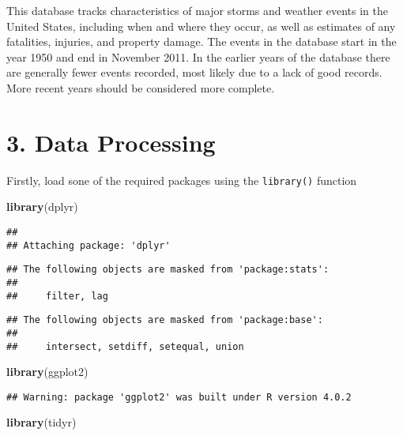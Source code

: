 \documentclass[]{article}
\newenvironment{Shaded}{\begin{snugshade}}{\end{snugshade}}
\newcommand{\KeywordTok}[1]{\textcolor[rgb]{0.13,0.29,0.53}{\textbf{#1}}}
\newcommand{\NormalTok}[1]{#1}
\begin{document}
This database tracks characteristics of major storms and weather events
in the United States, including when and where they occur, as well as
estimates of any fatalities, injuries, and property damage. The events
in the database start in the year 1950 and end in November 2011. In the
earlier years of the database there are generally fewer events recorded,
most likely due to a lack of good records. More recent years should be
considered more complete.

\section{3. Data Processing}\label{data-processing}

Firstly, load sone of the required packages using the \texttt{library()}
function

\begin{Shaded}
\begin{Highlighting}[]
\KeywordTok{library}\NormalTok{(dplyr)}
\end{Highlighting}
\end{Shaded}

\begin{verbatim}
## 
## Attaching package: 'dplyr'
\end{verbatim}

\begin{verbatim}
## The following objects are masked from 'package:stats':
## 
##     filter, lag
\end{verbatim}

\begin{verbatim}
## The following objects are masked from 'package:base':
## 
##     intersect, setdiff, setequal, union
\end{verbatim}

\begin{Shaded}
\begin{Highlighting}[]
\KeywordTok{library}\NormalTok{(ggplot2)}
\end{Highlighting}
\end{Shaded}

\begin{verbatim}
## Warning: package 'ggplot2' was built under R version 4.0.2
\end{verbatim}

\begin{Shaded}
\begin{Highlighting}[]
\KeywordTok{library}\NormalTok{(tidyr)}
\end{Highlighting}
\end{Shaded}
\end{document}
